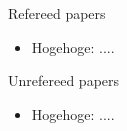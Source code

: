 \documentclass[12pt,epsf]{report}
\begin{document}
\begin{list}%
 {} %
 {} %
 \item Refereed papers
       \begin{itemize}
	\item Hogehoge: ....
       \end{itemize}
 \item Unrefereed papers
       \begin{itemize}
	\item Hogehoge: ....
       \end{itemize}
\end{list}

\newpage

%
%

\end{document}
